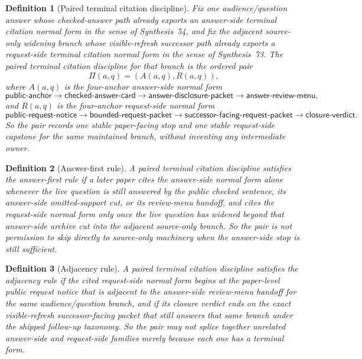 \documentclass[11pt]{article}
\newtheorem{definition}{Definition}
\begin{document}
\begin{definition}[Paired terminal citation discipline]
Fix one audience/question answer whose checked-answer path already exports an answer-side terminal citation normal form in the sense of Synthesis~54, and fix the adjacent source-only widening branch whose visible-refresh successor path already exports a request-side terminal citation normal form in the sense of Synthesis~73.
The \emph{paired terminal citation discipline} for that branch is the ordered pair
\[
\Pi(a,q)=(A(a,q),R(a,q)),
\]
where \(A(a,q)\) is the four-anchor answer-side normal form
\[
\textsf{public-anchor} \to \textsf{checked-answer-card} \to \textsf{answer-disclosure-packet} \to \textsf{answer-review-menu},
\]
and \(R(a,q)\) is the four-anchor request-side normal form
\[
\textsf{public-request-notice} \to \textsf{bounded-request-packet} \to \textsf{successor-facing-request-packet} \to \textsf{closure-verdict}.
\]
So the pair records one stable paper-facing stop and one stable request-side capstone for the same maintained branch, without inventing any intermediate owner.
\end{definition}

\begin{definition}[Answer-first rule]
A paired terminal citation discipline satisfies the \emph{answer-first rule} if a later paper cites the answer-side normal form alone whenever the live question is still answered by the public checked sentence, its answer-side omitted-support cut, or its review-menu handoff, and cites the request-side normal form only once the live question has widened beyond that answer-side archive cut into the adjacent source-only branch.
So the pair is not permission to skip directly to source-only machinery when the answer-side stop is still sufficient.
\end{definition}

\begin{definition}[Adjacency rule]
A paired terminal citation discipline satisfies the \emph{adjacency rule} if the cited request-side normal form begins at the paper-level public request notice that is adjacent to the answer-side review-menu handoff for the same audience/question branch, and if its closure verdict ends on the exact visible-refresh successor-facing packet that still answers that same branch under the shipped follow-up taxonomy.
So the pair may not splice together unrelated answer-side and request-side families merely because each one has a terminal form.
\end{definition}
\end{document}

